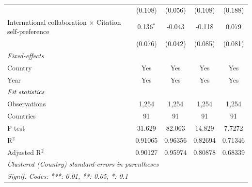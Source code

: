 \begin{table}[H]
\begin{tabular}{lcccc}
                                                                     & (0.108)           & (0.056)       & (0.108)                     & (0.188)\\   
      International collaboration $\times$ Citation self-preference  & 0.136$^{*}$       & -0.043        & -0.118                      & 0.079\\   
                                                                     & (0.076)           & (0.042)       & (0.085)                     & (0.081)\\   
      \midrule
      \emph{Fixed-effects}\\
      Country                                                        & Yes               & Yes           & Yes                         & Yes\\  
      Year                                                           & Yes               & Yes           & Yes                         & Yes\\  
      \midrule
      \emph{Fit statistics}\\
      Observations                                                   & 1,254             & 1,254         & 1,254                       & 1,254\\  
      Countries                                                      & 91                & 91            & 91                          & 91\\  
      F-test                                                         & 31.629            & 82.063        & 14.829                      & 7.7272\\  
      R$^2$                                                          & 0.91065           & 0.96356       & 0.82694                     & 0.71346\\  
      Adjusted R$^2$                                                 & 0.90127           & 0.95974       & 0.80878                     & 0.68339\\  
      \midrule \midrule
      \multicolumn{5}{l}{\emph{Clustered (Country) standard-errors in parentheses}}\\
      \multicolumn{5}{l}{\emph{Signif. Codes: ***: 0.01, **: 0.05, *: 0.1}}\\
   \end{tabular}
\end{table}


